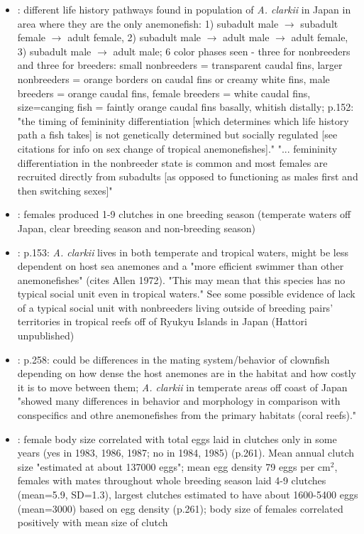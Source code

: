 \documentclass[12pt, oneside]{article}   	%
\begin{document}
\begin{itemize}
\item \cite{hattori1991life}: different life history pathways found in population of \textit{A. clarkii} in Japan in area where they are the only anemonefish: 1) subadult male $\rightarrow$ subadult female $\rightarrow$ adult female, 2) subadult male $\rightarrow$ adult male $\rightarrow$ adult female, 3) subadult male $\rightarrow$ adult male; 6 color phases seen - three for nonbreeders and three for breeders: small nonbreeders = transparent caudal fins, larger nonbreeders = orange borders on caudal fins or creamy white fins, male breeders =  orange caudal fins, female breeders =  white caudal fins, size=canging fish = faintly orange caudal fins basally, whitish distally; p.152: "the timing of femininity differentiation [which determines which life history path a fish takes] is not genetically determined but socially regulated [see citations for info on sex change of tropical anemonefishes]." "... femininity differentiation in the nonbreeder state is common and most females are recruited directly from subadults [as opposed to functioning as males first and then switching sexes]"
\item \cite{hattori1991life}: females produced 1-9 clutches in one breeding season (temperate waters off Japan, clear breeding season and non-breeding season)
\item \cite{hattori1991life}: p.153: \textit{A. clarkii} lives in both temperate and tropical waters, might be less dependent on host sea anemones and a "more efficient swimmer than other anemonefishes" (cites Allen 1972). "This may mean that this species has no typical social unit even in tropical waters." See some possible evidence of lack of a typical social unit with nonbreeders living outside of breeding pairs' territories in tropical reefs off of Ryukyu Islands in Japan (Hattori unpublished)
\item \cite{ochi1989mating}: p.258: could be differences in the mating system/behavior of clownfish depending on how dense the host anemones are in the habitat and how costly it is to move between them; \textit{A. clarkii} in temperate areas off coast of Japan "showed many differences in behavior and morphology in comparison with conspecifics and othre anemonefishes from the primary habitats (coral reefs)."
\item \cite{ochi1989mating}: female body size correlated with total eggs laid in clutches only in some years (yes in 1983, 1986, 1987; no in 1984, 1985) (p.261). Mean annual clutch size "estimated at about 137000 eggs"; mean egg density 79 eggs per $\text{cm}^2$, females with mates throughout whole breeding season laid 4-9 clutches (mean=5.9, SD=1.3), largest clutches estimated to have about 1600-5400 eggs (mean=3000) based on egg density (p.261); body size of females correlated positively with mean size of clutch

\end{itemize}
\end{document}
